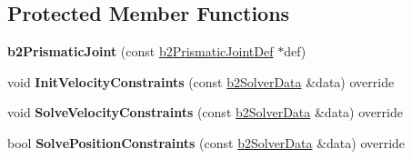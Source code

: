 \subsection*{Protected Member Functions}
\begin{DoxyCompactItemize}
\item 
\mbox{\label{classb2PrismaticJoint_ab1586a2334f7e32137fbd7f807e249ca}} 
{\bfseries b2\+Prismatic\+Joint} (const \mbox{\hyperlink{structb2PrismaticJointDef}{b2\+Prismatic\+Joint\+Def}} $\ast$def)
\item 
\mbox{\label{classb2PrismaticJoint_a840e9885d49bf621c46df79733df21dc}} 
void {\bfseries Init\+Velocity\+Constraints} (const \mbox{\hyperlink{structb2SolverData}{b2\+Solver\+Data}} \&data) override
\item 
\mbox{\label{classb2PrismaticJoint_a028c0ca03ca8437606d1175ca8de63d6}} 
void {\bfseries Solve\+Velocity\+Constraints} (const \mbox{\hyperlink{structb2SolverData}{b2\+Solver\+Data}} \&data) override
\item 
\mbox{\label{classb2PrismaticJoint_ac841608a56e83f709e08b805ed8c92e3}} 
bool {\bfseries Solve\+Position\+Constraints} (const \mbox{\hyperlink{structb2SolverData}{b2\+Solver\+Data}} \&data) override
\end{DoxyCompactItemize}
